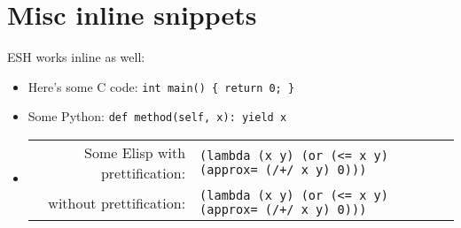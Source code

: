 \documentclass{article}
\def\cverb{\verb}
\def\pythonverb{\verb}
\def\prettylisp{\verb}
\def\normallisp{\verb}
\begin{document}
\clearpage

\section*{Misc inline snippets}

ESH works inline as well:

\begin{itemize}
\item Here's some C code: \cverb|int main() { return 0; }|
\item Some Python: \pythonverb|def method(self, x): yield x|
\item
  \begin{tabular}[t]{r l}
    Some Elisp with prettification: & \prettylisp|(lambda (x y) (or (<= x y) (approx= (/+/ x y) 0)))| \\
            without prettification: & \normallisp|(lambda (x y) (or (<= x y) (approx= (/+/ x y) 0)))| \\
  \end{tabular}
\end{itemize}


%
%
%
%
%
%
\end{document}
